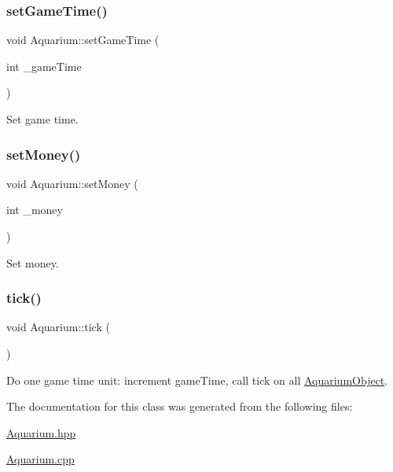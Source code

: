 \mbox{\label{class_aquarium_a93d5b161e95bf64fc36642d3ec93ca48}} 
\subsubsection{\texorpdfstring{set\+Game\+Time()}{setGameTime()}}
{\footnotesize\ttfamily void Aquarium\+::set\+Game\+Time (\begin{DoxyParamCaption}\item[{int}]{\+\_\+game\+Time }\end{DoxyParamCaption})}



Set game time. 

\mbox{\label{class_aquarium_a6a29945548af2f7cdf9b6cb07e83b41f}} 
\subsubsection{\texorpdfstring{set\+Money()}{setMoney()}}
{\footnotesize\ttfamily void Aquarium\+::set\+Money (\begin{DoxyParamCaption}\item[{int}]{\+\_\+money }\end{DoxyParamCaption})}



Set money. 

\mbox{\label{class_aquarium_a99572f6fe551c4ae73ca5150f6e2f111}} 
\subsubsection{\texorpdfstring{tick()}{tick()}}
{\footnotesize\ttfamily void Aquarium\+::tick (\begin{DoxyParamCaption}{ }\end{DoxyParamCaption})}



Do one game time unit\+: increment game\+Time, call tick on all \mbox{\hyperlink{class_aquarium_object}{Aquarium\+Object}}. 



The documentation for this class was generated from the following files\+:\begin{DoxyCompactItemize}
\item 
\mbox{\hyperlink{_aquarium_8hpp}{Aquarium.\+hpp}}\item 
\mbox{\hyperlink{_aquarium_8cpp}{Aquarium.\+cpp}}\end{DoxyCompactItemize}
